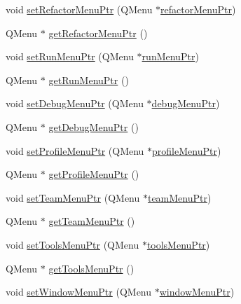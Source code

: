 \begin{DoxyCompactItemize}
\item 
void \hyperlink{class_master_gui_a63c4e2fc02d8101c5d2113783dc86449}{set\-Refactor\-Menu\-Ptr} (Q\-Menu $\ast$\hyperlink{class_master_gui_a44e789008fcc276a7a4294beb98d02c7}{refactor\-Menu\-Ptr})
\item 
Q\-Menu $\ast$ \hyperlink{class_master_gui_a53f1c9667111f13cf966c6eb9d0c6ebf}{get\-Refactor\-Menu\-Ptr} ()
\item 
void \hyperlink{class_master_gui_a9d5a2185276d6a2a7a62227b55e9c8be}{set\-Run\-Menu\-Ptr} (Q\-Menu $\ast$\hyperlink{class_master_gui_ae5b13b338972e99f29e623d258088b07}{run\-Menu\-Ptr})
\item 
Q\-Menu $\ast$ \hyperlink{class_master_gui_a1f42aebf18ac8c07ffcd057bd5bbe22b}{get\-Run\-Menu\-Ptr} ()
\item 
void \hyperlink{class_master_gui_ae43df54970c7b84ed577ac04d593e6f9}{set\-Debug\-Menu\-Ptr} (Q\-Menu $\ast$\hyperlink{class_master_gui_ac1efdb45cdde47584625a8026166c316}{debug\-Menu\-Ptr})
\item 
Q\-Menu $\ast$ \hyperlink{class_master_gui_af9af9881ddfbae0aa41c0a7c4095ac21}{get\-Debug\-Menu\-Ptr} ()
\item 
void \hyperlink{class_master_gui_ae4baf92ceb9abc180d12d133199780cd}{set\-Profile\-Menu\-Ptr} (Q\-Menu $\ast$\hyperlink{class_master_gui_a9c0ef6beee1cb9afcfff786bc4c6bd06}{profile\-Menu\-Ptr})
\item 
Q\-Menu $\ast$ \hyperlink{class_master_gui_a5d529e740085f8db54937ee0c50a40b3}{get\-Profile\-Menu\-Ptr} ()
\item 
void \hyperlink{class_master_gui_a06fc56181b6ae4854f3c51172d5672fb}{set\-Team\-Menu\-Ptr} (Q\-Menu $\ast$\hyperlink{class_master_gui_ad1d5b1e487d4695bab91ab0db856d795}{team\-Menu\-Ptr})
\item 
Q\-Menu $\ast$ \hyperlink{class_master_gui_ac65ef2f0b70bf6edf23fe7dfba0c8d94}{get\-Team\-Menu\-Ptr} ()
\item 
void \hyperlink{class_master_gui_a3361c70cc3726e7f91aaf856ab1df816}{set\-Tools\-Menu\-Ptr} (Q\-Menu $\ast$\hyperlink{class_master_gui_ab751e75ffdf91f5b90b4c2900975f308}{tools\-Menu\-Ptr})
\item 
Q\-Menu $\ast$ \hyperlink{class_master_gui_a8086c7b6829b3bd0cf3eccad2e608f02}{get\-Tools\-Menu\-Ptr} ()
\item 
void \hyperlink{class_master_gui_aea25ff33b56b0111863b5b7af3513a59}{set\-Window\-Menu\-Ptr} (Q\-Menu $\ast$\hyperlink{class_master_gui_ae33b742ac5529096317c8096984ffef1}{window\-Menu\-Ptr})
\item 

\end{DoxyCompactItemize}

